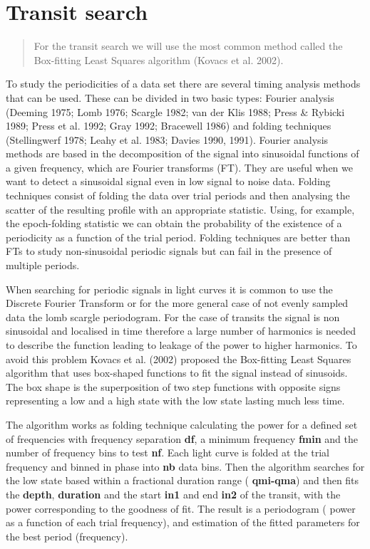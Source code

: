 \documentclass[12pt,twoside]{article}
\newcounter{problem}
\begin{document}
\section*{Transit search}

\begin{quote}
    For the transit search we will use the most common method called the Box-fitting Least Squares algorithm (Kovacs et al. 2002).
\end{quote}


To study the periodicities of a data set there are several timing analysis methods that can be used. These can be divided in two basic types: Fourier analysis (Deeming 1975; Lomb 1976; Scargle 1982; van der Klis 1988; Press \& Rybicki 1989; Press et al. 1992; Gray 1992; Bracewell 1986) and folding techniques (Stellingwerf 1978; Leahy et al. 1983; Davies 1990, 1991). Fourier analysis methods are based in the decomposition of the signal into sinusoidal functions of a given frequency, which are Fourier transforms (FT). They are useful when we want to detect a sinusoidal signal even in low signal to noise data. Folding techniques consist of folding the data over trial periods and then analysing the scatter of the resulting profile with an appropriate statistic. Using, for example, the epoch-folding statistic we can obtain the probability of the existence of a periodicity as a function of the trial period. Folding techniques are better than FTs to study non-sinusoidal periodic signals but can fail in the presence of multiple periods.

When searching for periodic signals in light curves it is common to use the Discrete Fourier Transform or for the more general case of  not evenly sampled data the lomb scargle periodogram.
For the case of transits the signal is non sinusoidal and localised in time therefore a large number of harmonics is needed to describe the function leading to leakage of the power to higher harmonics.  To avoid this problem Kovacs et al. (2002) proposed the  Box-fitting Least Squares algorithm that uses box-shaped functions to fit the signal instead of sinusoids. The box shape is 
the superposition of two step functions with opposite signs representing a low and a high state with the low state lasting much less time.
 
The algorithm works as folding technique calculating the power for a defined set of frequencies with frequency separation \textbf{df}, a minimum frequency \textbf{fmin} and the number of frequency bins to test \textbf{nf}. Each light curve is folded at the trial frequency and binned in phase into \textbf{nb} data bins. Then the algorithm searches for the low state based within a fractional duration range ( \textbf{qmi-qma}) and then fits the  \textbf{depth},  \textbf{duration} and the start \textbf{in1} and end \textbf{in2} of the transit, with the power corresponding to the goodness of fit. The result is a periodogram ( power as a function of each trial frequency),  and estimation of the fitted parameters for the best period (frequency).
 
\end{document}
